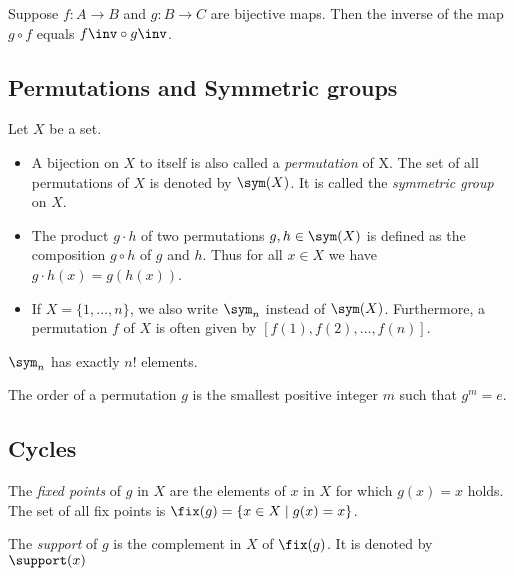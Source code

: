 \begin{lemma}
    Suppose $ f:A \to B $ and $ g:B \to C $ are bijective maps. Then the inverse
    of the map $ g \circ f $ equals $ f\inv \circ g\inv $.
\end{lemma}

\subsection{Permutations and Symmetric groups}
\begin{definition}
Let $X$ be a set.
\begin{itemize}
    \item A bijection on $X$ to itself is also called a \emph{permutation} of X.
    The set of all permutations of $X$ is denoted by $ \sym(X) $. It is called the
    \emph{symmetric group} on $X$.

    \item The product $ g \cdot h $ of two permutations $ g,h \in \sym(X) $ is
    defined as the composition $ g \circ h $ of $g$ and $h$. Thus for all $x \in X$
    we have $ g \cdot h(x) = g(h(x)) $.

    \item If $ X = \{1,\dots, n\} $, we also write $ \sym_n $ instead of $ \sym(X) $.
    Furthermore, a permutation $f$ of $X$ is often given by $ \left[f(1),f(2),\dots,f(n)\right] $.
\end{itemize}
\end{definition}

\begin{theorem}
    $ \sym_n $ has exactly $ n! $ elements.
\end{theorem}

\begin{definition}
    The order of a permutation $g$ is the smallest positive integer $m$ such that
    $ g^m = e $.
\end{definition}

\subsection{Cycles}
\begin{definition}
    The \emph{fixed points} of $g$ in $X$ are the elements of $x$ in $X$ for which
    $ g(x) = x $ holds. The set of all fix points is $ \fix(g) = \{x \in X \mid g(x) = x\} $.

    The \emph{support} of $g$ is the complement in $X$ of $ \fix(g) $. It is denoted
    by $ \support(x) $
\end{definition}

